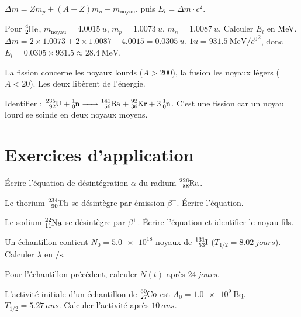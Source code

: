 $\Delta m = Z m_p + (A-Z) m_n - m_{\text{noyau}}$, puis $E_l = \Delta m \cdot c^2$.

\begin{exemple}
Pour $\ce{^{4}_{2}He}$, $m_{\text{noyau}} = \SI{4.0015}{u}$, $m_p = \SI{1.0073}{u}$, $m_n = \SI{1.0087}{u}$. Calculer $E_l$ en MeV.
$\Delta m = 2 \times 1.0073 + 2 \times 1.0087 - 4.0015 = \SI{0.0305}{u}$. $1 u = \SI{931.5}{\MeV\per\clight\squared}$, donc $E_l = 0.0305 \times 931.5 \approx \SI{28.4}{\MeV}$.
\end{exemple}

La fission concerne les noyaux lourds ($A > 200$), la fusion les noyaux légers ($A < 20$). Les deux libèrent de l'énergie.

\begin{exemple}
Identifier : $\ce{^{235}_{92}U + ^{1}_{0}n -> ^{141}_{56}Ba + ^{92}_{36}Kr + 3 ^{1}_{0}n}$.
C'est une fission car un noyau lourd se scinde en deux noyaux moyens.
\end{exemple}

\section{Exercices d'application}


\exo{} Écrire l'équation de désintégration $\alpha$ du radium $\ce{^{226}_{88}Ra}$.

\exo{} Le thorium $\ce{^{234}_{90}Th}$ se désintègre par émission $\beta^-$. Écrire l'équation.

\exo{} Le sodium $\ce{^{22}_{11}Na}$ se désintègre par $\beta^+$. Écrire l'équation et identifier le noyau fils.


\exo{} Un échantillon contient $N_0 = \num{5.0e18}$ noyaux de $\ce{^{131}_{53}I}$ ($T_{1/2} = \SI{8.02}{jours}$). Calculer $\lambda$ en $\si{\per\second}$.

\exo{} Pour l'échantillon précédent, calculer $N(t)$ après $\SI{24}{jours}$.

\exo{} L'activité initiale d'un échantillon de $\ce{^{60}_{27}Co}$ est $A_0 = \SI{1.0e9}{\becquerel}$. $T_{1/2} = \SI{5.27}{ans}$. Calculer l'activité après $\SI{10}{ans}$.


